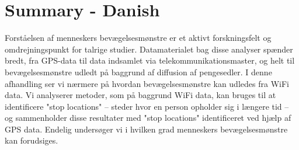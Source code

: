 \chapter{Summary - Danish}

Forståelsen af menneskers bevægelsesmønstre er et aktivt forskningsfelt og
omdrejningspunkt for talrige studier. Datamaterialet bag disse analyser spænder
bredt, fra GPS-data til data indsamlet via telekommunikationsmaster, og helt til
bevægelsesmønstre udledt på baggrund af diffusion af pengesedler. I denne
afhandling ser vi nærmere på hvordan bevægelsesmønstre kan udledes fra WiFi
data. Vi analyserer metoder, som på baggrund WiFi data, kan bruges til at
identificere "stop locations" -- steder hvor en person opholder sig i længere
tid -- og sammenholder disse resultater med "stop locations" identificeret ved
hjælp af GPS data. Endelig undersøger vi i hvilken grad menneskers
bevægelsesmønstre kan forudsiges.
